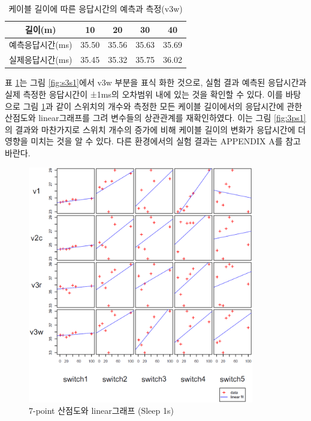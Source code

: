 \documentclass[11pt
  , a4paper
  , article
  , oneside
]{memoir}
\begin{document}
\begin{table}[!b]
\begin{center}
\begin{tabular}{c|c|c|c|c}\hline
길이(m) & 10 & 20 & 30 & 40 \\ \hline
예측응답시간(ms)& 35.50 & 35.56 & 35.63 & 35.69 \\ \hline
실제응답시간(ms)& 35.45 & 35.32 & 35.75 & 36.02 \\ \hline
\end{tabular}
\caption{케이블 길이에 따른 응답시간의 예측과 측정(v3w)}
  \label{table:predict_time}  
\end{center}
\end{table} 

표 \ref{table:predict_time}는 그림 \ref{fig:s3s1}에서  v3w 부분을 표식 화한 것으로, 실험 결과 예측된 응답시간과 실제 측정한 응답시간이 ±1ms의 오차범위 내에 있는 것을 확인할 수 있다. 이를 바탕으로 그림 \ref{fig:7ps1}과 같이  스위치의 개수와 측정한 모든 케이블 길이에서의 응답시간에 관한 산점도와 linear그래프를 그려 변수들의 상관관계를 재확인하였다. 이는 그림 \ref{fig:3ps1}의 결과와 마찬가지로 스위치 개수의 증가에 비해 케이블 길이의 변화가 응답시간에 더 영향을 미치는 것을 알 수 있다. 다른 환경에서의 실험 결과는 APPENDIX A를 참고 바란다.

\begin{figure}[!h]
  \centering
  \includegraphics[width=0.88\textwidth]{./images/7point_sleep1s.eps}
  \caption{7-point 산점도와 linear그래프 (Sleep 1s)}
  \label{fig:7ps1}   
\end{figure}
\end{document}
